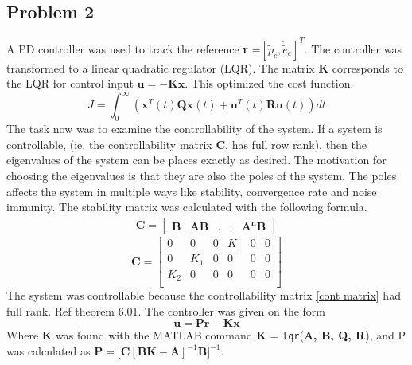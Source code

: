 \subsection{Problem 2}
A PD controller was used to track the reference \textbf{r} =$ [\tilde{p}_c , \dot{\tilde{e}}_c]^T$. The controller was transformed to a linear quadratic regulator (LQR). The matrix \textbf{K} corresponds to the LQR for control input $\textbf{u} = -\textbf{Kx}$. This optimized the cost function.
\begin{equation*}
        J = \int_{0}^{\infty}(\boldsymbol{x}^T(t) \boldsymbol{Qx}(t) +\boldsymbol{u}^T(t)\boldsymbol{Ru}(t))dt
\end{equation*}
The task now was to examine the controllability of the system. If a system is controllable, (ie. the controllability matrix \textbf{C}, has full row rank), then the eigenvalues of the system can be places exactly as desired. The motivation for choosing the eigenvalues is that they are also the poles of the system. The poles affects the system in multiple ways like stability, convergence rate and noise immunity. 
\newline
The stability matrix was calculated with the following formula.
\begin{subequations}
\begin{align*}
\textbf{C} = \begin{bmatrix}
    \boldsymbol{B} &
    \boldsymbol{AB} &
    . &
    .&
    \boldsymbol{A^nB}
    \end{bmatrix}
\end{align*}
\end{subequations}
\begin{equation}
\textbf{C}= \begin{bmatrix}\label{cont matrix}
    0 & 0 & 0 & K_1 & 0 & 0\\
    0 & K_1 & 0 & 0 & 0 & 0\\
    K_2 & 0 & 0 & 0 & 0 & 0\\
\end{bmatrix}
\end{equation}
The system was controllable because the controllability matrix \eqref{cont matrix} had full rank. Ref \cite{syllabus} theorem 6.01. The controller was given on the form 
\begin{equation}
    \boldsymbol{u = Pr -Kx}
\end{equation}
Where \textbf{K} was found with the MATLAB command \textbf{K} = \texttt{lqr}(\textbf{A, B, Q, R}), and P was calculated as $\boldsymbol{P} =\boldsymbol{[C[BK -A]}^{-1}\boldsymbol{ B]}^{-1}$.
